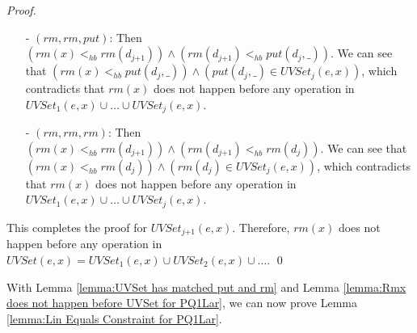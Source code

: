 \begin {proof}
\begin{itemize}
\begin{itemize}
    \item[-] If $\textit{put}(d_{\textit{ind}},\_) <_{hb} \textit{rm}(d_{\textit{ind-1}})$, then we obtain $T_{\textit{ind-1}}$, which already contain contradiction.
    \end{itemize}

    By base case $1$, base case $2$ and the induction step, it is easy to see that for each $i$, $T_i$ contains contradiction. Therefore, $T_j$, the case of $(\textit{rm},\textit{put},\textit{rm})$, contains contradiction.

\item[-] $(\textit{rm},\textit{rm},\textit{put})$: Then $( \textit{rm}(x) <_{hb} \textit{rm}(d_{\textit{j+1}}) ) \wedge ( \textit{rm}(d_{\textit{j+1}}) <_{hb} \textit{put}(d_j,\_) )$. We can see that $( \textit{rm}(x) <_{hb} \textit{put}(d_j,\_) ) \wedge ( \textit{put}(d_j,\_) \in \textit{UVSet}_j(e,x) )$, which contradicts that $\textit{rm}(x)$ does not happen before any operation in $\textit{UVSet}_1(e,x) \cup \ldots \cup \textit{UVSet}_j(e,x)$.

\item[-] $(\textit{rm},\textit{rm},\textit{rm})$: Then $( \textit{rm}(x) <_{hb} \textit{rm}(d_{\textit{j+1}}) ) \wedge ( \textit{rm}(d_{\textit{j+1}}) <_{hb} \textit{rm}(d_j) )$. We can see that $( \textit{rm}(x) <_{hb} \textit{rm}(d_j) ) \wedge ( \textit{rm}(d_j) \in \textit{UVSet}_j(e,x) )$, which contradicts that $\textit{rm}(x)$ does not happen before any operation in $\textit{UVSet}_1(e,x) \cup \ldots \cup \textit{UVSet}_j(e,x)$.
\end{itemize}

This completes the proof for $\textit{UVSet}_{\textit{j+1}}(e,x)$. Therefore, $\textit{rm}(x)$ does not happen before any operation in $\textit{UVSet}(e,x) = \textit{UVSet}_1(e,x) \cup \textit{UVSet}_2(e,x) \cup \ldots$. \qed
\end {proof}

With Lemma \ref{lemma:UVSet has matched put and rm} and Lemma \ref{lemma:Rmx does not happen before UVSet for PQ1Lar}, we can now prove Lemma \ref{lemma:Lin Equals Constraint for PQ1Lar}.

\LinEqualsConstraintforPQOneLar*

